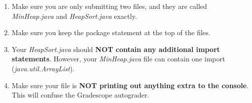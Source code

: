 \documentclass[paper=a4, fontsize=11pt, parskip=full]{scrartcl} %
\numberwithin{equation}{section} %
\numberwithin{figure}{section} %
\numberwithin{table}{section} %
\begin{document}
\begin{enumerate}
  \item Make sure you are only submitting two files, and they are called \emph{MinHeap.java} and \emph{HeapSort.java} exactly.
  \item Make sure you keep the package statement at the top of the files.
  \item Your \emph{HeapSort.java} should \textbf{NOT contain any additional import statements}. However, your \emph{MinHeap.java} file can contain one import (\emph{java.util.ArrayList}).
  \item Make sure your file is \textbf{NOT printing out anything extra to the console}. This will confuse the Gradescope autograder.
\end{enumerate}




\end{document}

